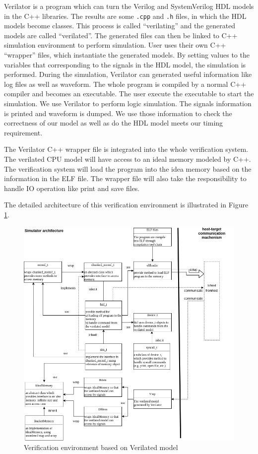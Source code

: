 Verilator is a program which can turn the Verilog and SystemVerilog HDL models in the C++ libraries. The results are some \texttt{.cpp} and \texttt{.h} files, in which the HDL models become classes. This process is called ``verilating'' and the generated models are called ``verilated''. The generated files can then be linked to C++ simulation environment to perform simulation. User uses their own C++ ``wrapper'' files, which instantiate the generated models. By setting values to the variables that corresponding to the signals in the HDL model, the simulation is performed. During the simulation, Verilator can generated useful information like log files as well as waveform. The whole program is compiled by a normal C++ compiler and becomes an executable. The user execute the executable to start the simulation. We use Verilator to perform logic simulation. The signals information is printed and waveform is dumped. We use those information to check the correctness of our model as well as do the HDL model meets our timing requirement.

The Verilator C++ wrapper file is integrated into the whole verification system. The verilated CPU model will have access to an ideal memory modeled by C++. The verification system will load the program into the idea memory based on the information in the ELF file. The wrapper file will also take the responsibility to handle IO operation like print and save files.

The detailed architecture of this verification environment is illustrated in Figure \ref{fig:ve-vm}. 

\begin{figure}[!htp]
    \centering
    \includegraphics[width=\textwidth]{figure/simulator-archiecture.png}
    \caption{Verification environment based on Verilated model}
    \label{fig:ve-vm}
\end{figure}

